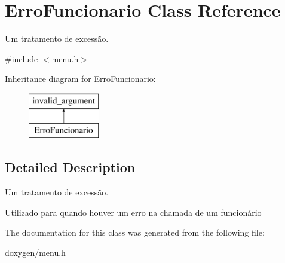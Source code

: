 \hypertarget{class_erro_funcionario}{}\section{Erro\+Funcionario Class Reference}
\label{class_erro_funcionario}


Um tratamento de excessão.  




{\ttfamily \#include $<$menu.\+h$>$}

Inheritance diagram for Erro\+Funcionario\+:\begin{figure}[H]
\begin{center}
\leavevmode
\includegraphics[height=2.000000cm]{class_erro_funcionario}
\end{center}
\end{figure}


\subsection{Detailed Description}
Um tratamento de excessão. 

Utilizado para quando houver um erro na chamada de um funcionário 

The documentation for this class was generated from the following file\+:\begin{DoxyCompactItemize}
\item 
doxygen/menu.\+h\end{DoxyCompactItemize}
